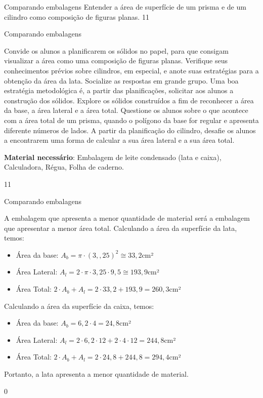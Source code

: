 \cleardoublepage
\def\currentcolor{session1}
\begin{objectives}{Comparando embalagens}
{
Entender a área de superfície de um prisma e de um cilindro como composição de figuras planas. 
}{1}{1}
\end{objectives}
\begin{sugestions}{Comparando embalagens}
{
Convide os alunos a planificarem os sólidos no papel, para que consigam visualizar a área como uma composição de figuras planas. Verifique seus conhecimentos prévios sobre cilindros, em especial, e anote suas estratégias para a obtenção da área da lata. Socialize as respostas em grande grupo. Uma boa estratégia metodológica é, a partir das planificações, solicitar aos alunos a construção dos sólidos. Explore os sólidos construídos a fim de reconhecer a área da base, a área lateral e a área total. Questione os alunos sobre o que acontece com a área total de um prisma, quando o polígono da base for regular e apresenta diferente números de lados. A partir da planificação do cilindro, desafie os alunos a encontrarem uma forma de calcular a sua área lateral e a sua área total.

\textbf{Material necessário}: Embalagem de leite condensado (lata e caixa), Calculadora, Régua, Folha de caderno.

}{1}{1}
\end{sugestions}
\begin{answer}{Comparando embalagens}
{
A embalagem que apresenta a menor quantidade de material será a embalagem que apresentar a menor área total. Calculando a área da superfície da lata, temos:
\begin{itemize}
\item Área da base: $A_b=\pi\cdot(3,{,}25)^2\cong33{,}2$cm²  
\item Área Lateral: $A_l=2\cdot\pi\cdot3{,}25\cdot9,5\cong193,9$cm²
\item Área Total: $2\cdot A_b+A_l=2\cdot33{,}2+193{,}9=260{,}3$cm²
\end{itemize}

Calculando a área da superfície da caixa, temos:
\begin{itemize}
\item Área da base: $A_b=6{,}2\cdot4=24{,}8$cm²
\item Área Lateral: $A_l=2\cdot6{,}2\cdot12+2\cdot4\cdot12=244{,}8$cm²
\item Área Total: $2\cdot A_b+A_l=2\cdot24{,}8+244{,}8=294{,}4$cm²
\end{itemize}
Portanto, a lata apresenta a menor quantidade de material.
}{0}
\end{answer}
